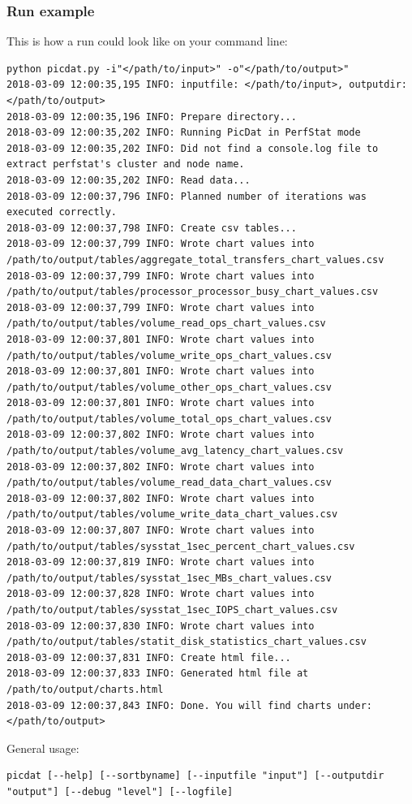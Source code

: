 \documentclass[8pt]{beamer}
\begin{document}
\begin{frame}[fragile]
\frametitle{Run example}
This is how a run could look like on your command line:
\smallskip

\begin{lstlisting}
python picdat.py -i"</path/to/input>" -o"</path/to/output>" 
2018-03-09 12:00:35,195 INFO: inputfile: </path/to/input>, outputdir: </path/to/output>
2018-03-09 12:00:35,196 INFO: Prepare directory...
2018-03-09 12:00:35,202 INFO: Running PicDat in PerfStat mode
2018-03-09 12:00:35,202 INFO: Did not find a console.log file to extract perfstat's cluster and node name.
2018-03-09 12:00:35,202 INFO: Read data...
2018-03-09 12:00:37,796 INFO: Planned number of iterations was executed correctly.
2018-03-09 12:00:37,798 INFO: Create csv tables...
2018-03-09 12:00:37,799 INFO: Wrote chart values into /path/to/output/tables/aggregate_total_transfers_chart_values.csv
2018-03-09 12:00:37,799 INFO: Wrote chart values into /path/to/output/tables/processor_processor_busy_chart_values.csv
2018-03-09 12:00:37,799 INFO: Wrote chart values into /path/to/output/tables/volume_read_ops_chart_values.csv
2018-03-09 12:00:37,801 INFO: Wrote chart values into /path/to/output/tables/volume_write_ops_chart_values.csv
2018-03-09 12:00:37,801 INFO: Wrote chart values into /path/to/output/tables/volume_other_ops_chart_values.csv
2018-03-09 12:00:37,801 INFO: Wrote chart values into /path/to/output/tables/volume_total_ops_chart_values.csv
2018-03-09 12:00:37,802 INFO: Wrote chart values into /path/to/output/tables/volume_avg_latency_chart_values.csv
2018-03-09 12:00:37,802 INFO: Wrote chart values into /path/to/output/tables/volume_read_data_chart_values.csv
2018-03-09 12:00:37,802 INFO: Wrote chart values into /path/to/output/tables/volume_write_data_chart_values.csv
2018-03-09 12:00:37,807 INFO: Wrote chart values into /path/to/output/tables/sysstat_1sec_percent_chart_values.csv
2018-03-09 12:00:37,819 INFO: Wrote chart values into /path/to/output/tables/sysstat_1sec_MBs_chart_values.csv
2018-03-09 12:00:37,828 INFO: Wrote chart values into /path/to/output/tables/sysstat_1sec_IOPS_chart_values.csv
2018-03-09 12:00:37,830 INFO: Wrote chart values into /path/to/output/tables/statit_disk_statistics_chart_values.csv
2018-03-09 12:00:37,831 INFO: Create html file...
2018-03-09 12:00:37,833 INFO: Generated html file at /path/to/output/charts.html
2018-03-09 12:00:37,843 INFO: Done. You will find charts under: </path/to/output>
\end{lstlisting}
\smallskip

General usage: 
\smallskip
\begin{lstlisting}
picdat [--help] [--sortbyname] [--inputfile "input"] [--outputdir "output"] [--debug "level"] [--logfile]
\end{lstlisting}
\end{frame}
\end{document}
